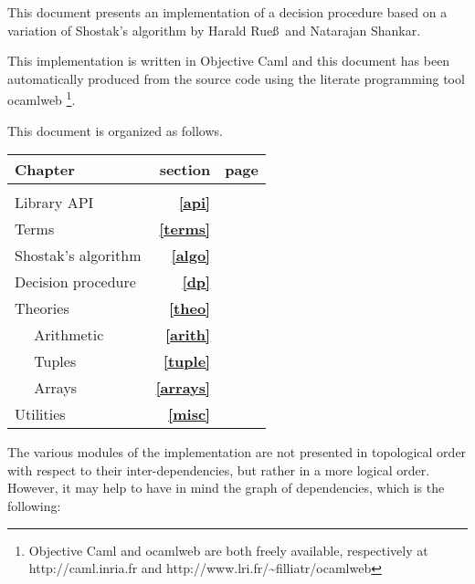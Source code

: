 

\newcommand{\replace}[2]{#1[#2]}
\newcommand{\norm}[2]{\mathit{norm}(#1)(#2)}
\newcommand{\lookup}[2]{\mathit{lookup}(#1)(#2)}
\newcommand{\can}[2]{\mathit{can}(#1)(#2)}
\newcommand{\dom}[1]{\mathit{dom}(#1)}
\newcommand{\compose}[2]{#1; #2}
\newcommand{\refsec}[1]{\textbf{\ref{#1}}}
\newcommand{\fullrefsec}[1]{Section~\textbf{\ref{#1}} page~\pageref{#1}}
\newcommand{\arrlk}[2]{#1[#2]}
\newcommand{\arrup}[3]{#1[#2:=#3]}


\ocwsection
This document presents an implementation of a decision
procedure based on a variation of Shostak's algorithm by Harald Rue\ss\
and Natarajan Shankar.

This implementation is written in \textsf{Objective Caml} and this
document has been automatically produced from the source code using
the literate programming tool \textsf{ocamlweb}%
\footnote{\textsf{Objective Caml} and
  \textsf{ocamlweb} are both freely available, respectively at
  \textsf{http://caml.inria.fr} and
  \textsf{http://www.lri.fr/\~{}filliatr/ocamlweb}}.

This document is organized as follows.
\begin{center}
  \begin{tabular}{p{10cm}rr}
    Chapter & section & page \\[0.5em]
    \hline\\[0.2em]
    Library API         \dotfill & \refsec{api}    & \pageref{api}    \\[0.5em]
    Terms               \dotfill & \refsec{terms}  & \pageref{terms}  \\[0.5em]
    Shostak's algorithm \dotfill & \refsec{algo}   & \pageref{algo}   \\[0.5em]
    Decision procedure  \dotfill & \refsec{dp}     & \pageref{dp}     \\[0.5em]
    Theories            \dotfill & \refsec{theo}   & \pageref{theo}   \\
    ~~ Arithmetic       \dotfill & \refsec{arith}  & \pageref{arith}  \\
    ~~ Tuples           \dotfill & \refsec{tuple}  & \pageref{tuple}  \\
    ~~ Arrays           \dotfill & \refsec{arrays} & \pageref{arrays} \\[0.5em]
    Utilities           \dotfill & \refsec{misc}   & \pageref{misc}   \\[0.5em]
  \end{tabular}
\end{center}    

The various modules of the implementation are not presented in
topological order with respect to their inter-dependencies, but
rather in a more logical order. However, it may help to have in mind
the graph of dependencies, which is the following:


\epsfxsize=15cm
\begin{center}
\end{center}
